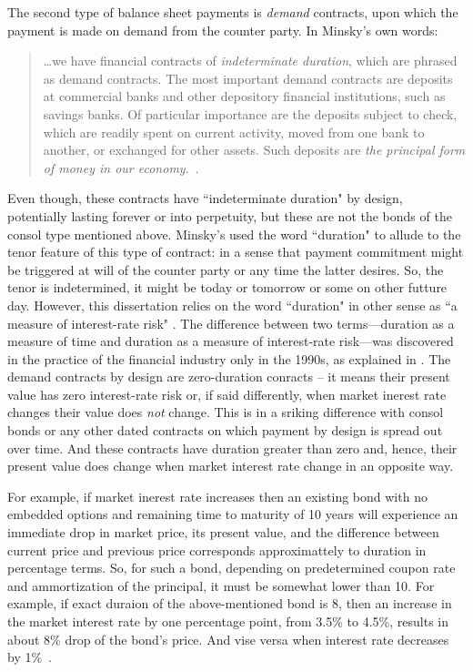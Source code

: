 The second type of balance sheet payments is \textit{demand} contracts, upon which the payment is made on demand from the counter party. In Minsky's own words: 

\begin{quote}
\dots we have financial contracts of \textit{indeterminate duration}, which are phrased as demand contracts. The most important demand contracts are deposits at commercial banks and other depository financial institutions, such as savings banks. Of particular importance are the deposits subject to check, which are readily spent on current activity, moved from one bank to another, or exchanged for other assets. Such deposits are \textit{the principal form of money in our economy}.~\citep[p.~225, emphasis added]{minsky1986}.
\end{quote}

Even though, these contracts have ``indeterminate duration" by design, potentially lasting forever or into perpetuity, but these are not the bonds of the consol type mentioned above. Minsky's used the word ``duration" to allude to the tenor feature of this type of contract: in a sense that payment commitment might be triggered at will of the counter party or any time the latter desires. So, the tenor is indetermined, it might be today or tomorrow or some on other futture day. However, this dissertation relies on the word ``duration" in other sense as ``a measure of interest-rate risk" \citep{fabozzi2022}. The difference between two terms---duration as a measure of time and duration as a measure of interest-rate risk---was discovered in the practice of the financial industry only in the 1990s, as explained in \citep[p.~9]{fabozzi2022}. The demand contracts by design are zero-duration conracts -- it means their present value has zero interest-rate risk or, if said differently, when market inerest rate changes their value does \textit{not} change. This is in a sriking difference with consol bonds or any other dated contracts on which payment by design is spread out over time. And these contracts have duration greater than zero and, hence, their present value does change when market interest rate change in an opposite way. 

For example, if market inerest rate increases then an existing bond with no embedded options and remaining time to maturity of 10 years will experience an immediate drop in market price, its present value, and the difference between current price and previous price corresponds approximattely to duration in percentage terms. So, for such a bond, depending on predetermined coupon rate and ammortization of the principal, it must be somewhat lower than 10. For example, if exact duraion of the above-mentioned bond is 8, then an increase in the market interest rate by one percentage point, from 3.5\% to 4.5\%, results in about 8\% drop of the bond's price. And vise versa when interest rate decreases by 1\%~\citep[see][p.~198, formula 9-2]{fabozzi2005}.

